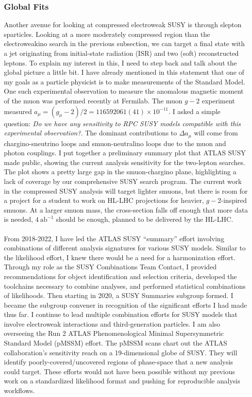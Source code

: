\subsubsection{Global Fits} \label{sssec:global-fits}
Another avenue for looking at compressed electroweak SUSY is through slepton sparticles. Looking at a more moderately compressed region than the electroweakino search in the previous subsection, we can target a final state with a jet originating from initial-state radiation (ISR) and two (soft) reconstructed leptons. To explain my interest in this, I need to step back and talk about the global picture a little bit. I have already mentioned in this statement that one of my goals as a particle physicist is to make measurements of the Standard Model. One such experimental observation to measure the anomalous magnetic moment of the muon was performed recently at Fermilab. The muon $g-2$ experiment measured $a_\mu = (g_\mu-2)/2 = 116 592 061 (41) \times 10^{-11}$. %
I asked a simple question: \textsl{Do we have any sensitivity to RPC SUSY models compatible with this experimental observation?}. %
The dominant contributions to $\Delta a_\mu$ will come from chargino-sneutrino loops and smuon-neutralino loops due to the muon and photon couplings. I put together a preliminary summary plot that ATLAS SUSY made public, showing the current analysis sensitivity for the two-lepton searches. The plot shows a pretty large gap in the smuon-chargino plane, highlighting a lack of coverage by our comprehensive SUSY search program. The current work in the compressed SUSY analysis will target lighter smuons, but there is room for a project for a student to work on HL-LHC projections for heavier, $g-2$-inspired smuons. At a larger smuon mass, the cross-section falls off enough that more data is needed, $4\ \mathrm{ab}^{-1}$ should be enough, planned to be delivered by the HL-LHC.
\\
\\
From 2018-2022, I have led the ATLAS SUSY \enquote{summary} effort involving combinations of different analysis signatures for various SUSY models. Similar to the likelihood effort, I knew there would be a need for a harmonization effort. Through my role as the SUSY Combinations Team Contact, I provided recommendations for object identification and selection criteria, developed the toolchains necessary to combine analyses, and performed statistical combinations of likelihoods. Then starting in 2020, a SUSY Summaries subgroup formed. I became the subgroup convener in recognition of the significant efforts I had made thus far. I continue to lead multiple combination efforts for SUSY models that involve electroweak interactions and third-generation particles. I am also overseeing the Run 2 ATLAS Phenomenological Minimal Supersymmetric Standard Model (pMSSM) effort. The pMSSM scans chart out the ATLAS collaboration's sensitivity reach on a 19-dimensional globe of SUSY. They will identify poorly-covered/uncovered regions of phase-space that a new analysis could target. These efforts would not have been possible without my previous work on a standardized likelihood format and pushing for reproducible analysis workflows.

